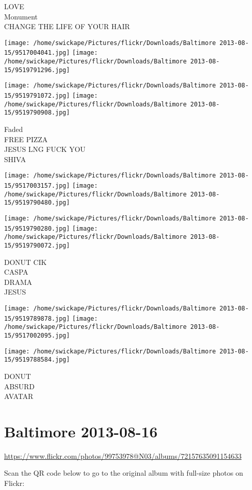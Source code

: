 \documentclass[10pt,letterpaper]{article}
\begin{document}
LOVE\\
Monument\\
CHANGE THE LIFE OF YOUR HAIR
\pagebreak

\texttt{[image: /home/swickape/Pictures/flickr/Downloads/Baltimore 2013-08-15/9517004041.jpg]}
\texttt{[image: /home/swickape/Pictures/flickr/Downloads/Baltimore 2013-08-15/9519791296.jpg]}

\texttt{[image: /home/swickape/Pictures/flickr/Downloads/Baltimore 2013-08-15/9519791072.jpg]}
\texttt{[image: /home/swickape/Pictures/flickr/Downloads/Baltimore 2013-08-15/9519790908.jpg]}

Faded\\
FREE PIZZA\\
JESUS LNG FUCK YOU\\
SHIVA
\pagebreak

\texttt{[image: /home/swickape/Pictures/flickr/Downloads/Baltimore 2013-08-15/9517003157.jpg]}
\texttt{[image: /home/swickape/Pictures/flickr/Downloads/Baltimore 2013-08-15/9519790480.jpg]}

\texttt{[image: /home/swickape/Pictures/flickr/Downloads/Baltimore 2013-08-15/9519790280.jpg]}
\texttt{[image: /home/swickape/Pictures/flickr/Downloads/Baltimore 2013-08-15/9519790072.jpg]}

DONUT CIK\\
CASPA\\
DRAMA\\
JESUS
\pagebreak

\texttt{[image: /home/swickape/Pictures/flickr/Downloads/Baltimore 2013-08-15/9519789878.jpg]}
\texttt{[image: /home/swickape/Pictures/flickr/Downloads/Baltimore 2013-08-15/9517002095.jpg]}

\texttt{[image: /home/swickape/Pictures/flickr/Downloads/Baltimore 2013-08-15/9519788584.jpg]}

DONUT\\
ABSURD\\
AVATAR
\pagebreak

\section*{Baltimore 2013-08-16}

\url{https://www.flickr.com/photos/99753978@N03/albums/72157635091154633}

Scan the QR code below to go to the original album with full-size photos on Flickr:
\end{document}
